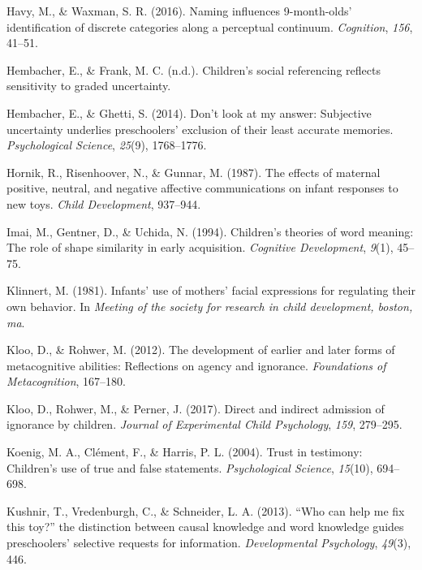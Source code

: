 \documentclass[floatsintext,man]{apa6}
\theoremstyle{definition}
\theoremstyle{definition}
\theoremstyle{definition}
\theoremstyle{remark}
\begin{document}
\hypertarget{ref-havy2016naming}{}
Havy, M., \& Waxman, S. R. (2016). Naming influences 9-month-olds'
identification of discrete categories along a perceptual continuum.
\emph{Cognition}, \emph{156}, 41--51.

\hypertarget{ref-hembacherchildren}{}
Hembacher, E., \& Frank, M. C. (n.d.). Children's social referencing
reflects sensitivity to graded uncertainty.

\hypertarget{ref-hembacher2014don}{}
Hembacher, E., \& Ghetti, S. (2014). Don't look at my answer: Subjective
uncertainty underlies preschoolers' exclusion of their least accurate
memories. \emph{Psychological Science}, \emph{25}(9), 1768--1776.

\hypertarget{ref-hornik1987effects}{}
Hornik, R., Risenhoover, N., \& Gunnar, M. (1987). The effects of
maternal positive, neutral, and negative affective communications on
infant responses to new toys. \emph{Child Development}, 937--944.

\hypertarget{ref-imai1994children}{}
Imai, M., Gentner, D., \& Uchida, N. (1994). Children's theories of word
meaning: The role of shape similarity in early acquisition.
\emph{Cognitive Development}, \emph{9}(1), 45--75.

\hypertarget{ref-klinnert1981infants}{}
Klinnert, M. (1981). Infants' use of mothers' facial expressions for
regulating their own behavior. In \emph{Meeting of the society for
research in child development, boston, ma}.

\hypertarget{ref-kloo2012development}{}
Kloo, D., \& Rohwer, M. (2012). The development of earlier and later
forms of metacognitive abilities: Reflections on agency and ignorance.
\emph{Foundations of Metacognition}, 167--180.

\hypertarget{ref-kloo2017direct}{}
Kloo, D., Rohwer, M., \& Perner, J. (2017). Direct and indirect
admission of ignorance by children. \emph{Journal of Experimental Child
Psychology}, \emph{159}, 279--295.

\hypertarget{ref-koenig2004trust}{}
Koenig, M. A., Clément, F., \& Harris, P. L. (2004). Trust in testimony:
Children's use of true and false statements. \emph{Psychological
Science}, \emph{15}(10), 694--698.

\hypertarget{ref-kushnir2013can}{}
Kushnir, T., Vredenburgh, C., \& Schneider, L. A. (2013). ``Who can help
me fix this toy?'' the distinction between causal knowledge and word
knowledge guides preschoolers' selective requests for information.
\emph{Developmental Psychology}, \emph{49}(3), 446.
\end{document}
